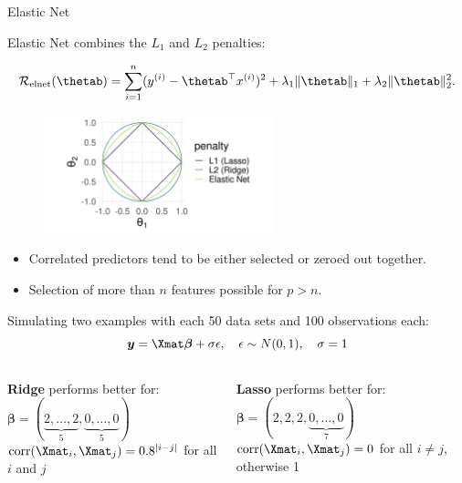 \begin{vbframe} {Elastic Net}


Elastic Net combines the $L_1$ and $L_2$ penalties:

$$
\mathcal{R}_{\text{elnet}}(\thetab) =  \sumin (\yi - \thetab^\top \xi)^2 + \lambda_1 \|\thetab\|_1 + \lambda_2 \|\thetab\|_2^2.
$$

\begin{figure}
\includegraphics[width=0.6\textwidth]{figure/lasso_ridge_enet_2d.png}\\
\end{figure}


\begin{itemize}
\item Correlated predictors tend to be either selected or zeroed out together.
\item Selection of more than $n$ features possible for $p>n$.
\end{itemize}


\framebreak
\footnotesize
Simulating two examples with each 50 data sets and 100 observations each: \\


$$\yv =\Xmat \boldsymbol{\beta}+\sigma \epsilon, \quad \epsilon \sim N(0,1), \quad \sigma = 1$$
  
  \begin{columns}
\begin{column}{0.5\textwidth}
\begin{center}
\textbf{Ridge} performs better for: \\ 
$\boldsymbol{\beta}=(\underbrace{2,\ldots,2}_{5},\underbrace{0,\ldots,0}_{5})$\\
$ \operatorname{corr}(\Xmat_{i},\Xmat_{j})=0.8^{|i-j|}$ for all $i$ and $j$
  \end{center}
\end{column}
\begin{column}{0.5\textwidth} 
\begin{center}
\textbf{Lasso} performs better for: \\
$\boldsymbol{\beta}=(2, 2, 2,\underbrace{0,\ldots,0}_{7})$ \\
$\operatorname{corr}(\Xmat_{i},\Xmat_{j})= 0$ for all $i \neq j$, otherwise 1
\end{center}
\end{column}
\end{columns}


\end{vbframe}
